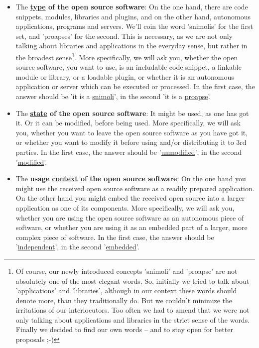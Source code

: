 \label{OsucTokens}
\begin{itemize}
  \item The \textbf{\underline{type} of the open source software}: On the one
  hand, there are code snippets, modules, libraries and plugins, and on the
  other hand, autonomous applications, programs and servers. We’ll coin the word
  ’snimolis’ for the first set, and ’proapses’ for the second. This is
  necessary, as we are not only talking about libraries and applications in the
  everyday sense, but rather in the broadest sense\footnote{Of course, our newly
  introduced concepts 'snimoli' and 'proapse' are not absolutely one of the most
  elegant words. So, initially we tried to talk about 'applications' and
  'libraries', although in our context these words should denote more, than they
  traditionally do. But we couldn't minimize the irritations of our
  interlocutors. Too often we had to amend that we were not only talking about
  applications and libraries in the strict sense of the words. Finally we
  decided to find our own words -- and to stay open for better proposals ;-) }.
  More specifically, we will ask you, whether the open source software, you want
  to use, is an includable code snippet, a linkable module or library, or a
  loadable plugin, or whether it is an autonomous application or server which
  can be executed or processed. In the first case, the answer should be 'it is a
  \underline{snimoli}', in the second 'it is a \underline{proapse}'.

  \item The \textbf{\underline{state} of the open source software}: It
  might be used, as one has got it. Or it can be modified, before being used.
  More specifically, we will ask you, whether you want to leave the open source
  software as you have got it, or whether you want to modify it before using
  and/or distributing it to 3rd parties. In the first case, the answer should be
  '\underline{unmodified}', in the second '\underline{modified}'.
  
  \item The \textbf{usage \underline{context} of the open source
  software}: On the one hand you might use the received open source software as a
  readily prepared application. On the other hand you might embed the received
  open source into a larger application as one of its components. More
  specifically, we will ask you, whether you are using the open source
  software as an autonomous piece of software, or whether you are using it as an
  embedded part of a larger, more complex piece of software. In the first case,
  the answer should be '\underline{independent}', in the second
  '\underline{embedded}'.
  

\end{itemize}
